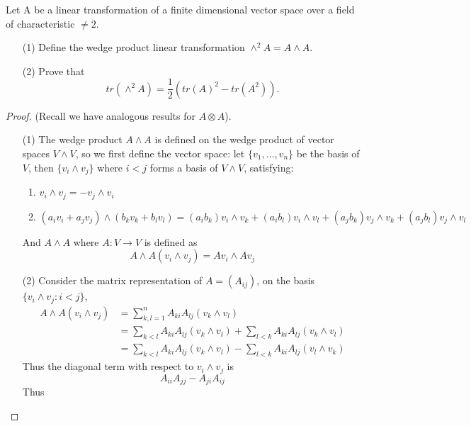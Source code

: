\documentclass[openany]{book}
\begin{document}
\begin{prob}
    Let A be a linear transformation of a finite dimensional vector space over a field of characteristic \(\neq 2\).
    \begin{itemize}
        \item[(1)] Define the wedge product linear transformation \(\wedge^{2}A=A\wedge A\).
        \item[(2)] Prove that
        \[tr(\wedge^{2}A)=\frac{1}{2}(tr(A)^{2}-tr(A^{2})).\]
    \end{itemize}
\end{prob}
\begin{proof}
    (Recall we have analogous results for $A\otimes A$).
    \begin{itemize}
        \item[(1)] The wedge product $A\wedge A$ is defined on the wedge product of vector spaces $V\wedge V$, so we first define the vector space: let $\{v_1,\dots, v_n\}$ be the basis of $V$, then $\{v_i\wedge v_j\}$ where $i<j$ forms a basis of $V\wedge V$, satisfying:
        \begin{enumerate}
            \item $v_i\wedge v_j=-v_j\wedge v_i$
            \item $(a_iv_i+a_jv_j)\wedge (b_kv_k+b_lv_l)=(a_ib_k)v_i\wedge v_k+(a_ib_l)v_i\wedge v_l+(a_jb_k)v_j\wedge v_k+(a_jb_l)v_j\wedge v_l$
        \end{enumerate}
        And $A\wedge A$ where $A:V\to V$ is defined as 
        \begin{equation*}
            A\wedge A(v_i\wedge v_j)=Av_i\wedge Av_j
        \end{equation*}
        \item[(2)] Consider the matrix representation of $A=(A_{ij})$, on the basis $\{v_i\wedge v_j: i<j\}$, 
        \begin{align*}
            A\wedge A(v_i\wedge v_j)&=\sum_{k,l=1}^nA_{ki}A_{lj}(v_k\wedge v_l)\\
            &=\sum_{k<l}A_{ki}A_{lj}(v_k\wedge v_l)+\sum_{l<k}A_{ki}A_{lj}(v_k\wedge v_l)\\
            &=\sum_{k<l}A_{ki}A_{lj}(v_k\wedge v_l)-\sum_{l<k}A_{ki}A_{lj}(v_l\wedge v_k)
        \end{align*}
        Thus the diagonal term with respect to $v_i\wedge v_j$ is 
        \begin{equation*}
            A_{ii}A_{jj}-A_{ji}A_{ij}
        \end{equation*}
        Thus 

\end{itemize}
\end{proof}
\end{document}
